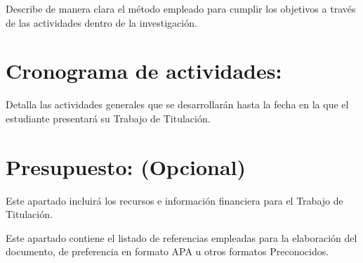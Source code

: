 \documentclass{article}
\begin{document}
Describe de manera clara el método empleado para cumplir los objetivos a través de las actividades dentro de la investigación. 
\section{Cronograma de actividades:}
Detalla las actividades generales que se desarrollarán hasta la fecha en la que el estudiante presentará su Trabajo de Titulación. 

\section{Presupuesto: (Opcional)}

Este apartado incluirá los recursos e información financiera para el Trabajo de Titulación. 






\vspace{1cm}
Este apartado contiene el listado de referencias empleadas para la elaboración del documento, de preferencia en formato APA u otros formatos Preconocidos.
\end{document}
